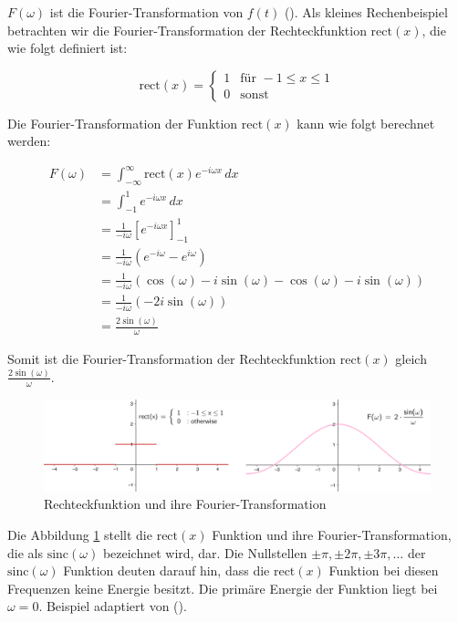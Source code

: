 \documentclass[11pt,a4paper]{article}
\begin{document}
\noindent
\(F(\omega)\) ist die Fourier-Transformation von \(f(t)\)
(\cite[49:27]{weitz2023fourier}). Als kleines Rechenbeispiel betrachten wir die
Fourier-Transformation der Rechteckfunktion \( \text{rect}(x) \), die wie folgt definiert ist:

\[
	\text{rect}(x) =
	\begin{cases}
		1 & \text{für } -1 \leq x \leq 1 \\
		0 & \text{sonst}
	\end{cases}
\]

\noindent
Die Fourier-Transformation der Funktion \( \text{rect}(x) \) kann wie folgt berechnet werden:

\begin{equation*}
	\begin{split}
		F(\omega) &= \int_{-\infty}^{\infty} \text{rect}(x) e^{-i \omega x} \, dx \\
		&= \int_{-1}^{1} e^{-i \omega x} \, dx \\
		&= \frac{1}{-i \omega} \left[ e^{-i \omega x} \right]_{-1}^{1} \\
		&= \frac{1}{-i \omega} \left( e^{-i \omega} - e^{i \omega} \right) \\
		&= \frac{1}{-i \omega} \left( \cos(\omega) - i \sin(\omega) - \cos(\omega) - i \sin(\omega) \right) \\
		&= \frac{1}{-i \omega} \left( -2 i \sin(\omega) \right) \\
		&= \frac{2 \sin(\omega)}{\omega}
	\end{split}
\end{equation*}
\noindent

\noindent
\newline
Somit ist die Fourier-Transformation der Rechteckfunktion \( \text{rect}(x) \) gleich
\( \displaystyle\frac{2 \sin(\omega)}{\omega} \).

\begin{figure}[h]
	\centering
	\includegraphics[width=0.8\linewidth]{img/example-fourier-trans.png}
	\caption{Rechteckfunktion und ihre Fourier-Transformation}
	\label{fig:fourier_transform}
\end{figure}

\noindent
Die Abbildung \ref{fig:fourier_transform} stellt die \( \text{rect}(x) \) Funktion und ihre
Fourier-Transformation, die als \( \text{sinc}(\omega) \) bezeichnet wird, dar. Die Nullstellen
\( \pm \pi, \pm 2 \pi, \pm 3 \pi, \dots \) der \( \text{sinc}(\omega) \) Funktion deuten darauf
hin, dass die \( \text{rect}(x) \) Funktion bei diesen Frequenzen keine Energie besitzt. Die
primäre Energie der Funktion liegt bei \( \omega=0 \). Beispiel adaptiert von
(\cite[Chapter~5 - Example~5.1]{hansen2014fourier}).
\end{document}
